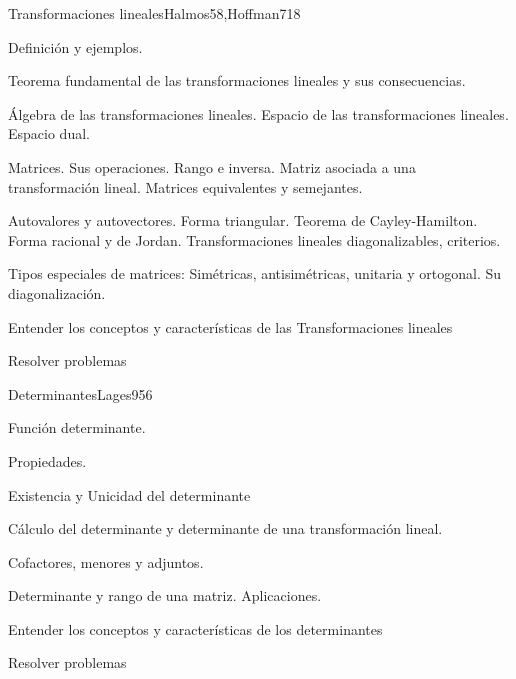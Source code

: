 \begin{syllabus}
\begin{unit}{Transformaciones lineales}{Halmos58,Hoffman71}{8}
   \begin{topics}
         \item  Definición y ejemplos.
	 \item  Teorema fundamental de las transformaciones lineales y sus consecuencias.
         \item  Álgebra de las transformaciones lineales. Espacio de las transformaciones lineales. Espacio dual.
	 \item  Matrices. Sus operaciones. Rango e inversa. Matriz asociada a una transformación lineal. Matrices equivalentes y semejantes.
         \item  Autovalores y autovectores. Forma triangular. Teorema de Cayley-Hamilton. Forma racional y de  Jordan. Transformaciones lineales diagonalizables, criterios.
	 \item  Tipos especiales de matrices: Simétricas, antisimétricas, unitaria y ortogonal. Su diagonalización.
   \end{topics}

   \begin{unitgoals}
         \item  Entender los conceptos y características de las Transformaciones lineales
         \item  Resolver problemas
   \end{unitgoals}
\end{unit}

\begin{unit}{Determinantes}{Lages95}{6}
   \begin{topics}
         \item  Función determinante.
	 \item  Propiedades.
         \item  Existencia y Unicidad del determinante
	 \item  Cálculo del determinante y determinante de una transformación lineal.
         \item  Cofactores, menores y adjuntos.
	\item Determinante y rango de una matriz. Aplicaciones.
   \end{topics}

   \begin{unitgoals}
         \item  Entender los conceptos y características de los determinantes
         \item  Resolver problemas
   \end{unitgoals}
\end{unit}


\end{syllabus}

